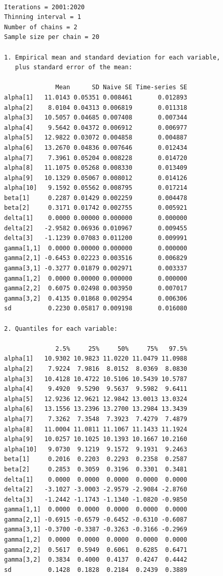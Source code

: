 \documentclass[
  letterpaper,
  DIV=11,
  numbers=noendperiod]{scrreprt}
\begin{document}
\begin{verbatim}

Iterations = 2001:2020
Thinning interval = 1 
Number of chains = 2 
Sample size per chain = 20 

1. Empirical mean and standard deviation for each variable,
   plus standard error of the mean:

              Mean      SD Naive SE Time-series SE
alpha[1]   11.0143 0.05351 0.008461       0.012893
alpha[2]    8.0104 0.04313 0.006819       0.011318
alpha[3]   10.5057 0.04685 0.007408       0.007344
alpha[4]    9.5642 0.04372 0.006912       0.006977
alpha[5]   12.9822 0.03072 0.004858       0.004887
alpha[6]   13.2670 0.04836 0.007646       0.012434
alpha[7]    7.3961 0.05204 0.008228       0.014720
alpha[8]   11.1075 0.05268 0.008330       0.013409
alpha[9]   10.1329 0.05067 0.008012       0.014126
alpha[10]   9.1592 0.05562 0.008795       0.017214
beta[1]     0.2287 0.01429 0.002259       0.004478
beta[2]     0.3171 0.01742 0.002755       0.005921
delta[1]    0.0000 0.00000 0.000000       0.000000
delta[2]   -2.9582 0.06936 0.010967       0.009455
delta[3]   -1.1239 0.07083 0.011200       0.009991
gamma[1,1]  0.0000 0.00000 0.000000       0.000000
gamma[2,1] -0.6453 0.02223 0.003516       0.006829
gamma[3,1] -0.3277 0.01879 0.002971       0.003337
gamma[1,2]  0.0000 0.00000 0.000000       0.000000
gamma[2,2]  0.6075 0.02498 0.003950       0.007017
gamma[3,2]  0.4135 0.01868 0.002954       0.006306
sd          0.2230 0.05817 0.009198       0.016080

2. Quantiles for each variable:

              2.5%     25%     50%     75%   97.5%
alpha[1]   10.9302 10.9823 11.0220 11.0479 11.0988
alpha[2]    7.9224  7.9816  8.0152  8.0369  8.0830
alpha[3]   10.4128 10.4722 10.5106 10.5439 10.5787
alpha[4]    9.4920  9.5290  9.5637  9.5982  9.6411
alpha[5]   12.9236 12.9621 12.9842 13.0013 13.0324
alpha[6]   13.1556 13.2396 13.2700 13.2984 13.3439
alpha[7]    7.3262  7.3548  7.3923  7.4279  7.4879
alpha[8]   11.0004 11.0811 11.1067 11.1433 11.1924
alpha[9]   10.0257 10.1025 10.1393 10.1667 10.2160
alpha[10]   9.0730  9.1219  9.1572  9.1931  9.2463
beta[1]     0.2016  0.2203  0.2293  0.2358  0.2587
beta[2]     0.2853  0.3059  0.3196  0.3301  0.3481
delta[1]    0.0000  0.0000  0.0000  0.0000  0.0000
delta[2]   -3.1027 -3.0003 -2.9579 -2.9084 -2.8760
delta[3]   -1.2442 -1.1743 -1.1340 -1.0820 -0.9850
gamma[1,1]  0.0000  0.0000  0.0000  0.0000  0.0000
gamma[2,1] -0.6915 -0.6579 -0.6452 -0.6310 -0.6087
gamma[3,1] -0.3700 -0.3387 -0.3263 -0.3166 -0.2969
gamma[1,2]  0.0000  0.0000  0.0000  0.0000  0.0000
gamma[2,2]  0.5617  0.5949  0.6061  0.6285  0.6471
gamma[3,2]  0.3834  0.4000  0.4137  0.4247  0.4442
sd          0.1428  0.1828  0.2184  0.2439  0.3889
\end{verbatim}
\end{document}
